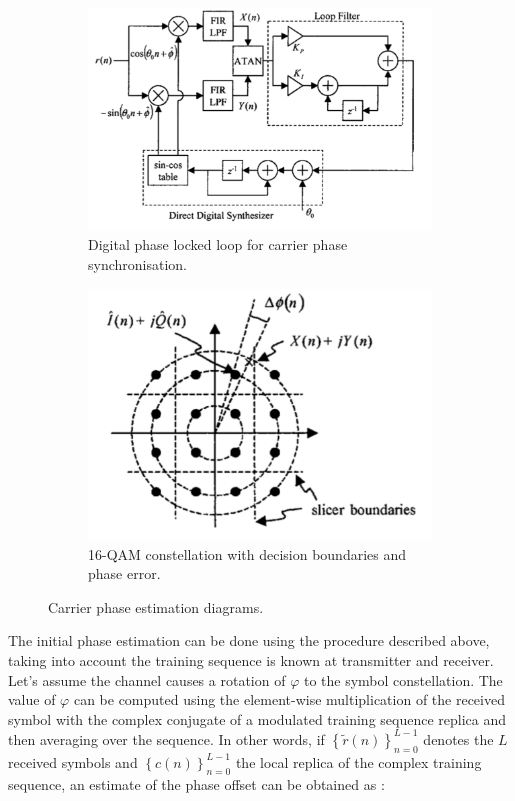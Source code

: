 \documentclass[12pt,a4paper,openright]{report}
\begin{document}
 \begin{figure}[H]
 \centering
\begin{subfigure}{0.5\textwidth}
 \centering
    \includegraphics[width=0.9\linewidth]{DPLL.pdf}
    \caption{Digital phase locked loop for carrier phase \\ synchronisation. \\}
    \label{fig:DPLL}
\end{subfigure}%
\begin{subfigure}{0.5\textwidth}
 \centering
    \includegraphics[width=0.7\linewidth]{PD.pdf}
    \caption{16-QAM constellation with decision boundaries and phase error.}
    \label{fig:PD1}
    \end{subfigure}
    \caption[Carrier phase estimation diagrams]{Carrier phase estimation diagrams\label{CarrierSynchPaper}.}
    \label{fig:carrierphase}
\end{figure}

The initial phase estimation can be done using the procedure described above, taking into account the training sequence is known at transmitter and receiver. Let's assume the channel causes a rotation of $\varphi$ to the symbol constellation. The value of $\varphi$ can be computed using the element-wise multiplication of the received symbol with the complex conjugate of a modulated training sequence replica and then averaging over the sequence. In other words, if ${\left\{ {\tilde r(n)} \right\}_{n = 0}^{L - 1}}$ denotes the $L$ received symbols and ${\left\{ {c(n)} \right\}_{n = 0}^{L - 1}}$ the local replica of the complex training sequence, an estimate of the phase offset can be obtained as \cite{ProjectEQ2310}:
\end{document}
